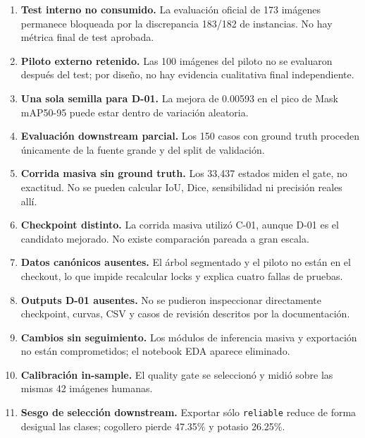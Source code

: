 \documentclass[11pt,a4paper]{article}
\begin{document}
\begin{enumerate}

\item \textbf{Test interno no consumido.} La evaluación oficial de 173 imágenes permanece bloqueada por la discrepancia 183/182 de instancias. No hay métrica final de test aprobada.

\item \textbf{Piloto externo retenido.} Las 100 imágenes del piloto no se evaluaron después del test; por diseño, no hay evidencia cualitativa final independiente.

\item \textbf{Una sola semilla para D-01.} La mejora de 0.00593 en el pico de Mask mAP50-95 puede estar dentro de variación aleatoria.

\item \textbf{Evaluación downstream parcial.} Los 150 casos con ground truth proceden únicamente de la fuente grande y del split de validación.

\item \textbf{Corrida masiva sin ground truth.} Los 33,437 estados miden el gate, no exactitud. No se pueden calcular IoU, Dice, sensibilidad ni precisión reales allí.

\item \textbf{Checkpoint distinto.} La corrida masiva utilizó C-01, aunque D-01 es el candidato mejorado. No existe comparación pareada a gran escala.

\item \textbf{Datos canónicos ausentes.} El árbol segmentado y el piloto no están en el checkout, lo que impide recalcular locks y explica cuatro fallas de pruebas.

\item \textbf{Outputs D-01 ausentes.} No se pudieron inspeccionar directamente checkpoint, curvas, CSV y casos de revisión descritos por la documentación.

\item \textbf{Cambios sin seguimiento.} Los módulos de inferencia masiva y exportación no están comprometidos; el notebook EDA aparece eliminado.

\item \textbf{Calibración in-sample.} El quality gate se seleccionó y midió sobre las mismas 42 imágenes humanas.

\item \textbf{Sesgo de selección downstream.} Exportar sólo \texttt{reliable} reduce de forma desigual las clases; cogollero pierde 47.35\% y potasio 26.25\%.


\end{enumerate}
\end{document}
